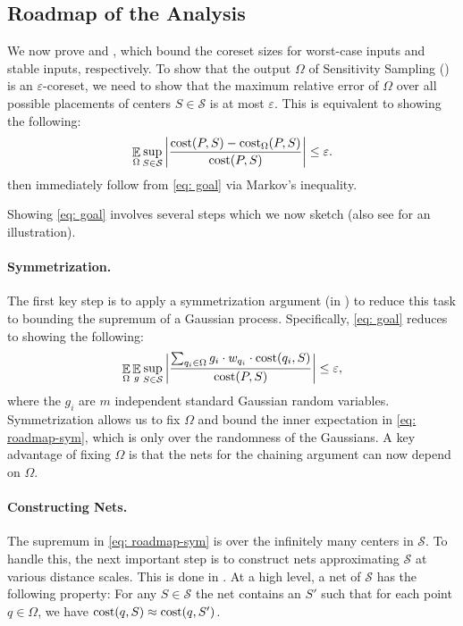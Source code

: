 \documentclass[11pt]{article}
\theoremstyle{restate}
\theoremstyle{definition}
\newcommand{\eps}{\ensuremath{\varepsilon}}
\newcommand{\E}{\mathop{\mathbb{E}}}
\newcommand{\cost}{\textnormal{cost}}
\newcommand{\costom}{\cost_\Omega} %
\begin{document}
\subsection{Roadmap of the Analysis}


We now prove   and , which bound the coreset sizes for worst-case inputs and stable inputs, respectively.  To show that the output $\Omega$ of 
Sensitivity Sampling () is an $\eps$-coreset, we need to show that the maximum relative error of $\Omega$ over all possible placements of centers $S \in \mathcal{S}$ is at most $\eps$. This is equivalent to showing the following: 
\begin{align}\label{eq: goal}
	\begin{split}
		\E_{ \Omega} \sup_{S \in \mathcal{S}} \left\lvert \frac{\cost(P,S) - \costom(P,S)}{\cost(P,S) } \right\rvert \leq \eps.
	\end{split}
\end{align}
 then immediately follow from \eqref{eq: goal} via Markov's inequality. 


Showing \eqref{eq: goal} involves several steps which we now sketch (also see  for an illustration).

\paragraph{Symmetrization.} The first key step is to apply a symmetrization argument (in ) to reduce this task to bounding the supremum of a Gaussian process.  
Specifically, \eqref{eq: goal} reduces to showing the following:
\begin{align}\label{eq: roadmap-sym}
\E_{ \Omega} \E_{g} \sup_{S \in \mathcal{S}} \left\lvert \frac{\sum_{q_i \in \Omega}g_i \cdot w_{q_i} \cdot \cost(q_i,S) }{\cost(P,S)} \right\rvert  \leq \eps,
\end{align}
where the $g_i$ are $m$ independent standard Gaussian random variables. Symmetrization allows us to fix $\Omega$ and bound the inner expectation in \eqref{eq: roadmap-sym}, which is only over the randomness of the Gaussians. A key advantage of fixing $\Omega$ is that the nets for the chaining argument can now depend on $\Omega$.


\paragraph{Constructing Nets. } The supremum in \eqref{eq: roadmap-sym} is over the infinitely many centers in $\mathcal{S}$. To handle this, the next important step is to construct nets approximating $\mathcal{S}$  at various distance scales. This is done in . At a high level, a net of $\mathcal{S}$ has the following property:  For any $S \in \mathcal{S}$ the net contains an $S'$  such that for each point  $q \in \Omega$, we have $\cost(q,S) \approx \cost(q,S')$.  
\end{document}
